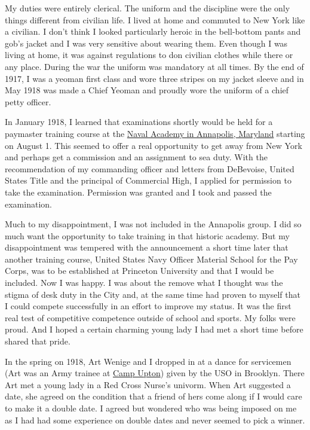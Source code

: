 \documentclass[12pt]{book}              %
\begin{document}
My duties were entirely clerical. The uniform and the discipline were the only things different from civilian life. I lived at home and commuted to New York like a civilian. I don't think I looked particularly heroic in the bell-bottom pants and gob's jacket and I was very sensitive about wearing them. Even though I was living at home, it was against regulations to don civilian clothes while there or any place. During the war the uniform was mandatory at all times. By the end of 1917, I was a yeoman first class and wore three stripes on my jacket sleeve and in May 1918 was made a Chief Yeoman and proudly wore the uniform of a chief petty officer. 

In January 1918, I learned that examinations shortly would be held for a paymaster training course at the \href{http://en.wikipedia.org/wiki/United_States_Naval_Academy}{Naval Academy in Annapolis, Maryland} starting on August 1. This seemed to offer a real opportunity to get away from New York and perhaps get a commission and an assignment to sea duty. With the recommendation of my commanding officer and letters from DeBevoise, United States Title and the principal of Commercial High, I applied for permission to take the examination. Permission was granted and I took and passed the examination.

Much to my disappointment, I was not included in the Annapolis group. I did so much want the opportunity to take training in that historic academy. But my disappointment was tempered with the announcement a short time later that another training course, United States Navy Officer Material School for the Pay Corps, was to be established at Princeton University and that I would be included. Now I was happy. I was about the remove what I thought was the stigma of desk duty in the City and, at the same time had proven to myself that I could compete successfully in an effort to improve my status. It was the first real test of competitive competence outside of school and sports. My folks were proud. And I hoped a certain charming young lady I had met a short time before shared that pride. 

In the spring on 1918, Art Wenige and I dropped in at a dance for servicemen (Art was an Army trainee at \href{http://en.wikipedia.org/wiki/Camp_Upton}{Camp Upton}) given by the USO in Brooklyn. There Art met a young lady in a Red Cross Nurse's univorm. When Art suggested a date, she agreed on the condition that a friend of hers come along if I would care to make it a double date. I agreed but wondered who was being imposed on me as I had had some experience on double dates and never seemed to pick a winner. 
\end{document}
